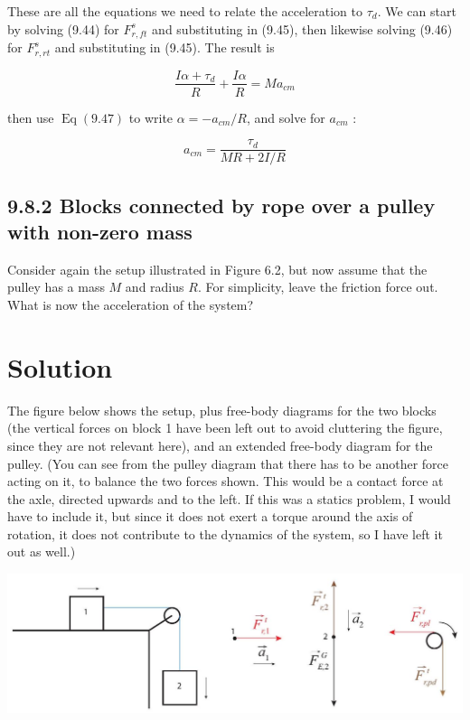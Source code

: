 \documentclass[10pt]{article}
\begin{document}
These are all the equations we need to relate the acceleration to $\tau_{d}$. We can start by solving (9.44) for $F_{r, f t}^{s}$ and substituting in (9.45), then likewise solving (9.46) for $F_{r, r t}^{s}$ and substituting in (9.45). The result is


\begin{equation*}
\frac{I \alpha+\tau_{d}}{R}+\frac{I \alpha}{R}=M a_{c m} \tag{9.48}
\end{equation*}


then use $\operatorname{Eq}(9.47)$ to write $\alpha=-a_{c m} / R$, and solve for $a_{c m}$ :


\begin{equation*}
a_{c m}=\frac{\tau_{d}}{M R+2 I / R} \tag{9.49}
\end{equation*}


\subsection*{9.8.2 Blocks connected by rope over a pulley with non-zero mass}
Consider again the setup illustrated in Figure 6.2, but now assume that the pulley has a mass $M$ and radius $R$. For simplicity, leave the friction force out. What is now the acceleration of the system?

\section*{Solution}
The figure below shows the setup, plus free-body diagrams for the two blocks (the vertical forces on block 1 have been left out to avoid cluttering the figure, since they are not relevant here), and an extended free-body diagram for the pulley. (You can see from the pulley diagram that there has to be another force acting on it, to balance the two forces shown. This would be a contact force at the axle, directed upwards and to the left. If this was a statics problem, I would have to include it, but since it does not exert a torque around the axis of rotation, it does not contribute to the dynamics of the system, so I have left it out as well.)

\begin{center}
\includegraphics[max width=\textwidth]{2024_09_14_9969b06773f10b6936e8g-233}
\end{center}
\end{document}
